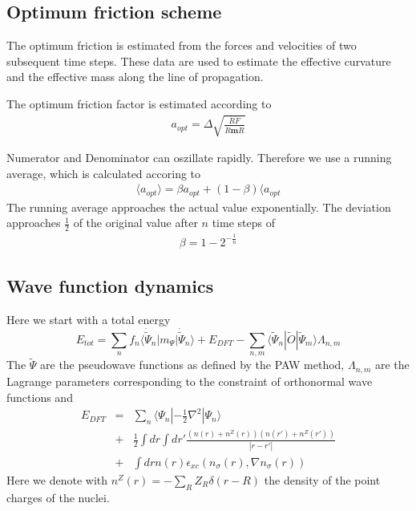 \documentclass[final,12pt]{article}
\begin{document}
{{{%
\subsection{Optimum friction scheme}
\label{sec:optfric}
The optimum friction is estimated from the forces and velocities of
two subsequent time steps. These data are used to estimate the
effective curvature and the effective mass along the line of
propagation.

The optimum friction factor is estimated according to
\begin{eqnarray*}
a_{opt}=\Delta\sqrt{\frac{\dot{R}\dot{F}}{\dot{R}\mathbf{m}\dot{R}}}
\end{eqnarray*}

Numerator and Denominator can oszillate rapidly. Therefore we use a
running average, which is calculated accoring to
\begin{eqnarray*}
\langle a_{opt}\rangle=\beta a_{opt}+(1-\beta)\langle a_{opt}
\end{eqnarray*}
The running average approaches the actual value exponentially. The
deviation approaches $\frac{1}{2}$ of the original value after $n$
time steps of
\begin{eqnarray*}
\beta=1-2^{-\frac{1}{n}}
\end{eqnarray*}


\subsection{Wave function dynamics}
Here we start with a total energy
\begin{equation}
E_{tot}=\sum_n f_n\langle\dot{\tilde\Psi}_n|m_\Psi|\dot{\tilde\Psi}_n\rangle+E_{DFT}
-\sum_{n,m} \langle\tilde\Psi_n|\tilde{O}|\tilde\Psi_m\rangle\Lambda_{n,m}
\end{equation}
The $\tilde\Psi$ are the pseudowave functions as defined by the PAW
method, $\Lambda_{n,m}$ are the Lagrange parameters corresponding to
the constraint of orthonormal wave functions and 
\begin{eqnarray*}
E_{DFT}&=&\sum_n\langle\Psi_n|-\frac{1}{2}\nabla^2|\Psi_n\rangle
\\
&+&\frac{1}{2}\int dr \int dr' \frac{(n(r)+n^Z(r))(n(r')+n^Z(r'))}{|r-r'|}
\\
&+&\int dr n(r) \epsilon_{xc}(n_\sigma(r),\nabla n_\sigma(r))
\end{eqnarray*}
Here we denote with $n^Z(r)=-\sum_R Z_R\delta(r-R)$ the density of the
point charges of the nuclei. 

}}}
\end{document}
